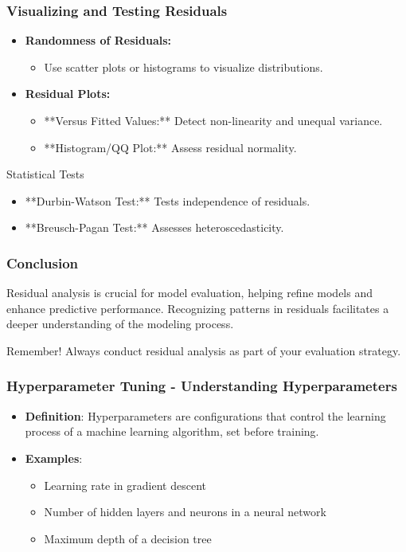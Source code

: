 \documentclass[aspectratio=169]{beamer}
\begin{document}
\begin{frame}[fragile]
    \frametitle{Visualizing and Testing Residuals}
    \begin{itemize}
        \item \textbf{Randomness of Residuals:}
        \begin{itemize}
            \item Use scatter plots or histograms to visualize distributions.
        \end{itemize}
        
        \item \textbf{Residual Plots:}
        \begin{itemize}
            \item **Versus Fitted Values:** Detect non-linearity and unequal variance.
            \item **Histogram/QQ Plot:** Assess residual normality.
        \end{itemize}
    \end{itemize}
    
    \begin{block}{Statistical Tests}
        \begin{itemize}
            \item **Durbin-Watson Test:** Tests independence of residuals.
            \item **Breusch-Pagan Test:** Assesses heteroscedasticity.
        \end{itemize}
    \end{block}
\end{frame}

\begin{frame}[fragile]
    \frametitle{Conclusion}
    Residual analysis is crucial for model evaluation, helping refine models and enhance predictive performance. Recognizing patterns in residuals facilitates a deeper understanding of the modeling process.
   
    \begin{block}{Remember!}
        Always conduct residual analysis as part of your evaluation strategy.
    \end{block}
\end{frame}

\begin{frame}[fragile]
    \frametitle{Hyperparameter Tuning - Understanding Hyperparameters}
    \begin{itemize}
        \item \textbf{Definition}: Hyperparameters are configurations that control the learning process of a machine learning algorithm, set before training.
        \item \textbf{Examples}:
        \begin{itemize}
            \item Learning rate in gradient descent
            \item Number of hidden layers and neurons in a neural network
            \item Maximum depth of a decision tree
        \end{itemize}
    \end{itemize}
\end{frame}
\end{document}
